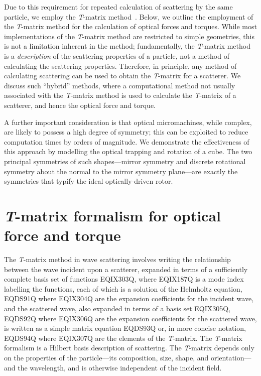 Due to this requirement for repeated calculation of scattering by
the same particle, we employ the \textit{T}-matrix
method~\cite{waterman1971,mishchenko2004b}.
Below, we outline the employment of the \textit{T}-matrix method
for the calculation of optical forces and torques. While most
implementations of the \textit{T}-matrix method are
restricted to simple geometries, this is not a limitation
inherent in the method; fundamentally, the \textit{T}-matrix
method is a \emph{description} of the scattering properties of
a particle, not a method of calculating the scattering properties.
Therefore, in principle, any method of calculating scattering
can be used to obtain the \textit{T}-matrix for a scatterer.
We discuss such ``hybrid'' methods, where a computational method
not usually associated with the \textit{T}-matrix method is
used to calculate the \textit{T}-matrix of a scatterer, and hence
the optical force and torque.

A further important consideration is that optical micromachines,
while complex, are likely to possess a high degree of symmetry; this
can be exploited to reduce computation times by orders of magnitude.
We demonstrate the effectiveness of this approach by modelling
the optical trapping and rotation of a cube. The two principal
symmetries of such shapes---mirror symmetry and discrete rotational
symmetry about the normal to the mirror symmetry plane---are
exactly the symmetries that typify the ideal optically-driven rotor.


\section{\textit{T}-matrix formalism for optical force and torque}

The \textit{T}-matrix method in wave scattering involves writing the
relationship between the wave incident upon a scatterer, expanded in terms of
a sufficiently complete basis set of functions EQIX303Q,
where EQIX187Q is a mode index labelling the functions, each of which is a
solution of the Helmholtz equation,
EQDS91Q
where EQIX304Q are the expansion coefficients for the incident wave,
and the scattered wave, also expanded in terms of a basis set
EQIX305Q,
EQDS92Q
where EQIX306Q are the expansion coefficients for the scattered wave,
is written as a simple matrix equation
EQDS93Q
or,  in more concise notation,
EQDS94Q
where EQIX307Q are the elements of the \textit{T}-matrix. The
\textit{T}-matrix formalism is a Hilbert basis description of
scattering. The \textit{T}-matrix depends only on the properties of the
particle---its composition,  size,
shape, and orientation---and the wavelength, and is otherwise
independent of the incident field.

